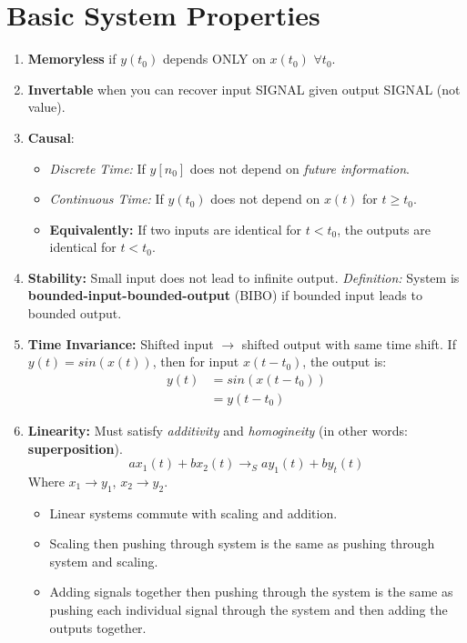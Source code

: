 \documentclass[a4paper,12pt]{report}
\begin{document}
\section{Basic System Properties}

\begin{enumerate}
\item \textbf{Memoryless} if $y(t_0)$ depends ONLY on $x(t_0)$ $\forall t_0$.
\item \textbf{Invertable} when you can recover input SIGNAL given output SIGNAL (not value).
\item \textbf{Causal}:
\begin{itemize}
\item \textit{Discrete Time: } If $y[n_0]$ does not depend on \textit{future information}.
\item \textit{Continuous Time: } If $y(t_0)$ does not depend on $x(t)$ for $t \geq t_0$.
\item \textbf{Equivalently: } If two inputs are identical for $t < t_0$, the outputs are identical for $t < t_0$.
\end{itemize}
\item \textbf{Stability: } Small input does not lead to infinite output. \textit{Definition: } System is \textbf{bounded-input-bounded-output} (BIBO) if bounded input leads to bounded output.
\item \textbf{Time Invariance: } Shifted input $\to$ shifted output with same time shift. If $y(t) = sin(x(t))$, then for input $x(t-t_0)$, the output is: 
\begin{equation}
\begin{split}
y(t) &= sin(x(t-t_0)) \\
&= y(t-t_0)
\end{split}
\end{equation}
\item \textbf{Linearity: } Must satisfy \textit{additivity} and \textit{homogineity} (in other words: \textbf{superposition}).
$$ax_1(t) + bx_2(t) \to_S ay_1(t) + by_t(t)$$
Where $x_1 \to y_1$, $x_2 \to y_2$.
\begin{itemize}
\item Linear systems commute with scaling and addition. 
\item Scaling then pushing through system is the same as pushing through system and scaling. 
\item Adding signals together then pushing through the system is the same as pushing each individual signal through the system and then adding the outputs together.
\end{itemize}
\end{enumerate}
\end{document}
